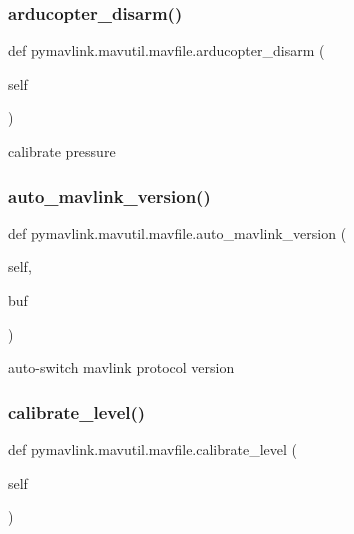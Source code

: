 \subsubsection{\texorpdfstring{arducopter\+\_\+disarm()}{arducopter\_disarm()}}
{\footnotesize\ttfamily def pymavlink.\+mavutil.\+mavfile.\+arducopter\+\_\+disarm (\begin{DoxyParamCaption}\item[{}]{self }\end{DoxyParamCaption})}

\begin{DoxyVerb}calibrate pressure\end{DoxyVerb}
 \mbox{\label{classpymavlink_1_1mavutil_1_1mavfile_af0f0faf1986ca88353787674f7575862}} 
\subsubsection{\texorpdfstring{auto\+\_\+mavlink\+\_\+version()}{auto\_mavlink\_version()}}
{\footnotesize\ttfamily def pymavlink.\+mavutil.\+mavfile.\+auto\+\_\+mavlink\+\_\+version (\begin{DoxyParamCaption}\item[{}]{self,  }\item[{}]{buf }\end{DoxyParamCaption})}

\begin{DoxyVerb}auto-switch mavlink protocol version\end{DoxyVerb}
 \mbox{\label{classpymavlink_1_1mavutil_1_1mavfile_a56b77586434e96ca161d4744104fe313}} 
\subsubsection{\texorpdfstring{calibrate\+\_\+level()}{calibrate\_level()}}
{\footnotesize\ttfamily def pymavlink.\+mavutil.\+mavfile.\+calibrate\+\_\+level (\begin{DoxyParamCaption}\item[{}]{self }\end{DoxyParamCaption})}

